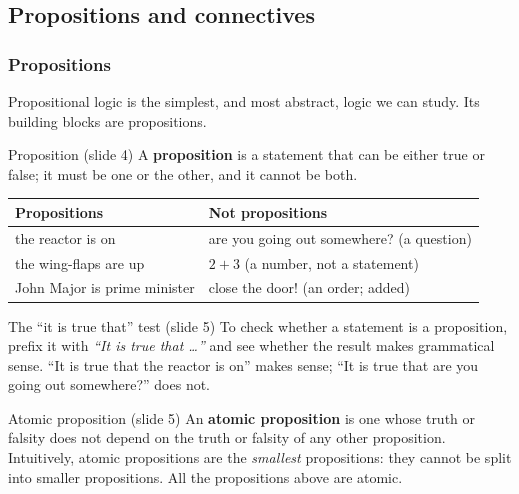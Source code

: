 \subsection{Propositions and connectives}
\label{sec:connectives}

\subsubsection{Propositions}

Propositional logic is the simplest, and most abstract, logic we can study. Its building
blocks are propositions.

\begin{nbdef}{Proposition (slide 4)}
A \textbf{proposition} is a statement that can be either true or false; it must be one or
the other, and it cannot be both.
\end{nbdef}

\begin{center}
\small
\begin{tabular}{@{}ll@{}}
\toprule
\textbf{Propositions} & \textbf{Not propositions} \\
\midrule
the reactor is on & are you going out somewhere? \quad\textcolor{nbgray}{(a question)} \\
the wing-flaps are up & $2+3$ \quad\textcolor{nbgray}{(a number, not a statement)} \\
John Major is prime minister & close the door! \quad\textcolor{nbgray}{(an order; added)} \\
\bottomrule
\end{tabular}
\end{center}

\begin{nbfact}{The ``it is true that'' test (slide 5)}
To check whether a statement is a proposition, prefix it with \emph{``It is true that
\ldots''} and see whether the result makes grammatical sense. ``It is true that the reactor
is on'' makes sense; ``It is true that are you going out somewhere?'' does not.
\end{nbfact}

\begin{nbdef}{Atomic proposition (slide 5)}
An \textbf{atomic proposition} is one whose truth or falsity does not depend on the truth
or falsity of any other proposition. Intuitively, atomic propositions are the
\emph{smallest} propositions: they cannot be split into smaller propositions. All the
propositions above are atomic.
\end{nbdef}

